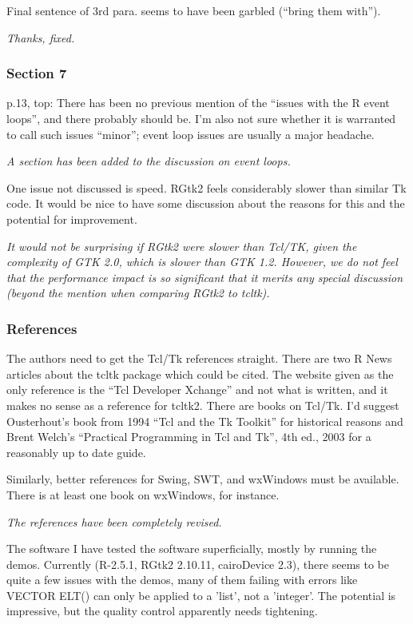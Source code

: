 \documentclass{article}
\begin{document}
Final sentence of 3rd para. seems to have been garbled (``bring them with'').

\emph{Thanks, fixed.}

\subsubsection*{Section 7}

p.13, top: There has been no previous mention of the ``issues with the R event
loops'', and there probably should be. I'm also not sure whether it is warranted
to call such issues ``minor''; event loop issues are usually a major headache.

\emph{A section has been added to the discussion on event loops.}

One issue not discussed is speed. RGtk2 feels considerably slower than similar
Tk code. It would be nice to have some discussion about the reasons for this
and the potential for improvement.

\emph{It would not be surprising if RGtk2 were slower than Tcl/TK, given the
complexity of GTK 2.0, which is slower than GTK 1.2. However, we do
not feel that the performance impact is so significant that it merits any
special discussion (beyond the mention when comparing RGtk2 to tcltk).
}

\subsubsection*{References}

The authors need to get the Tcl/Tk references straight. There are two R News
articles about the tcltk package which could be cited. The website given as the
only reference is the ``Tcl Developer Xchange'' and not what is written, and it
makes no sense as a reference for tcltk2.
There are books on Tcl/Tk. I'd suggest Ousterhout's book from 1994 ``Tcl and
the Tk Toolkit'' for historical reasons and Brent Welch's ``Practical Programming
in Tcl and Tk'', 4th ed., 2003 for a reasonably up to date guide.

Similarly, better references for Swing, SWT, and wxWindows must be available.
There is at least one book on wxWindows, for instance.

\emph{The references have been completely revised.}

The software
I have tested the software superficially, mostly by running the demos. Currently
(R-2.5.1, RGtk2 2.10.11, cairoDevice 2.3), there seems to be quite a few
issues with the demos, many of them failing with errors like VECTOR ELT()
can only be applied to a 'list', not a 'integer'. The potential is impressive,
but the quality control apparently needs tightening. 
\end{document}
